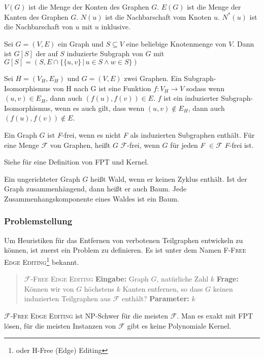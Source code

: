\documentclass[12pt,a4paper,onecolumn,oneside,titlepage]{article}
\newcommand\cursive[1]{\ensuremath{\mathcal{#1}}}
\begin{document}
$V(G)$ ist die Menge der Konten des Graphen $G$. $E(G)$ ist die Menge der Kanten des Graphen $G$. $N(u)$ ist die Nachbarschaft vom Knoten $u$. $N^{*}(u)$ ist die Nachbarschaft von $u$ mit $u$ inklusive.

Sei $G = (V,E)$ ein Graph und $S \subseteq V$ eine beliebige Knotenmenge von $V$. 
Dann ist $G[S]$ der auf $S$ induzierte Subgraph von $G$ mit $G[S] = (S, E \cap \{\{u,v\} \,|\, u \in S \land w \in S\})$

Sei $H = (V_H,E_H)$ und $G =(V,E)$ zwei Graphen. Ein Subgraph-Isomorphismus von H nach G ist eine Funktion $f : V_H \rightarrow V$ sodass wenn $(u,v) \in E_H $, dann auch $(f(u),f(v)) \in E$. $f$ ist ein induzierter Subgraph-Isomorphismus, wenn es auch gilt, dass wenn $(u,v) \notin E_H$, dann auch $(f(u),f(v)) \notin E$.

Ein Graph $G$ ist \textit{F}-frei, wenn es nicht \textit{F} als induzierten Subgraphen enthält.
Für eine Menge \cursive{F} von Graphen, heißt $G$ \cursive{F}-frei, wenn $G$ für jeden \textit{F} $\in \cursive{F}$ \textit{F}-frei ist.


Siehe \cite{Cai96} für eine Definition von FPT und Kernel.

Ein ungerichteter Graph $G$ heißt Wald, wenn er keinen Zyklus enthält. Ist der Graph zusammenhängend, dann heißt er auch Baum. Jede Zusammenhangskomponente eines Waldes ist ein Baum.

\subsubsection{Problemstellung}
\label{sec:problem}
Um Heuristiken für das Entfernen von verbotenen Teilgraphen entwickeln zu können, ist zuerst ein Problem zu definieren. Es ist unter dem Namen \textsc{F-Free Edge Editing}\footnote{oder H-Free (Edge) Editing} bekannt.
\begin{quote}
  \textsc{\cursive{F}-Free Edge Editing}\newline
  \textbf{Eingabe:} Graph $G$, natürliche Zahl $k$\newline
  \textbf{Frage:} Können wir von $G$ höchstens $k$ Kanten entfernen, so dass $G$ keinen induzierten Teilgraphen aus \cursive{F} enthält?\newline
  \textbf{Parameter:} $k$
\end{quote}
\textsc{\cursive{F}-Free Edge Editing} ist NP-Schwer für die meisten \cursive{F}. Man es exakt mit FPT lösen\cite{Cai96}, für die meisten Instanzen von \cursive{F} gibt es keine Polynomiale Kernel.
\end{document}
